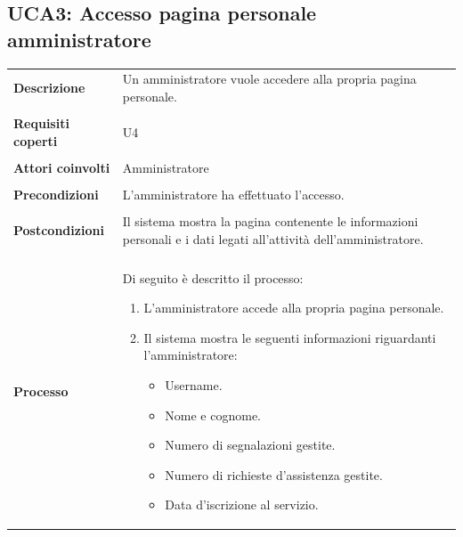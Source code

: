 \documentclass[10pt,a4paper]{report}
\begin{document}
	\subsection{UCA3: Accesso pagina personale amministratore}
	\begin{tabular}{lp{}}
		\textbf{Descrizione}&Un amministratore vuole accedere alla propria pagina personale.\\
		\\
		\textbf{Requisiti coperti}&U4\\
		\\
		\textbf{Attori coinvolti}&Amministratore\\
		\\
		\textbf{Precondizioni}&L'amministratore ha effettuato l'accesso.\\
		\\
		\textbf{Postcondizioni}&Il sistema mostra la pagina contenente le informazioni personali e i dati legati all'attività dell'amministratore.\\
		\\
		\textbf{Processo}&Di seguito è descritto il processo:
		\begin{enumerate}
			\item L'amministratore accede alla propria pagina personale.
			\item Il sistema mostra le seguenti informazioni riguardanti l'amministratore:
			\begin{itemize}
				\item Username.
				\item Nome e cognome.
				\item Numero di segnalazioni gestite.
				\item Numero di richieste d'assistenza gestite.
				\item Data d'iscrizione al servizio.
			\end{itemize}
		\end{enumerate}
	\end{tabular}
	
\end{document}
